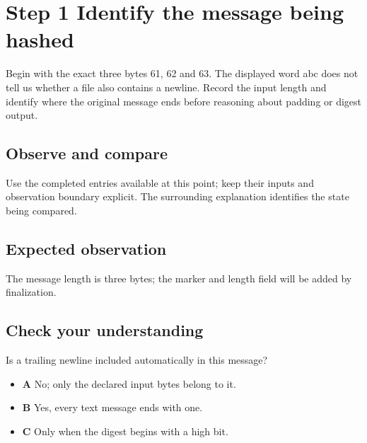 \section{Step 1 Identify the message being hashed}\label{sha-s01}

Begin with the exact three bytes 61, 62 and 63. The displayed word abc does not tell us whether a file also contains a newline. Record the input length and identify where the original message ends before reasoning about padding or digest output.

\subsection{Observe and compare}
Use the completed entries available at this point; keep their inputs and observation boundary explicit. The surrounding explanation identifies the state being compared.

\subsection{Expected observation}
The message length is three bytes; the marker and length field will be added by finalization.

\subsection{Check your understanding}
Is a trailing newline included automatically in this message?

\begin{itemize}
  \item \textbf{A} No; only the declared input bytes belong to it.
  \item \textbf{B} Yes, every text message ends with one.
  \item \textbf{C} Only when the digest begins with a high bit.
\end{itemize}
